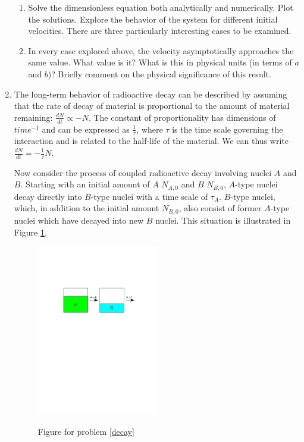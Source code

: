 \documentclass{article}
\begin{document}
\begin{enumerate}
\begin{enumerate}
		\item Solve the dimensionless equation both analytically and numerically. Plot the solutions. Explore the behavior of the system for different initial velocities. There are three particularly interesting cases to be examined.
		\item In every case explored above, the velocity asymptotically approaches the same value. What value is it? What is this in physical units (in terms of $a$ and $b$)? Briefly comment on the physical significance of this result.
	\end{enumerate}
\item\label{decay} The long-term behavior of radioactive decay can be described by assuming that the rate of decay of material is proportional to the amount of material remaining: $\frac{dN}{dt}\propto-N$. The constant of proportionality has dimensions of $time^{-1}$ and can be expressed as $\frac{1}{\tau}$, where $\tau$ is the time scale governing the interaction and is related to the half-life of the material. We can thus write $\frac{dN}{dt}=-\frac{1}{\tau}N$. 

Now consider the process of coupled radioactive decay involving nuclei $A$ and $B$. Starting with an initial amount of $A$ $N_{A,0}$ and $B$ $N_{B,0}$, $A$-type nuclei decay directly into $B$-type nuclei with a time scale of $\tau_A$. $B$-type nuclei, which, in addition to the initial amount $N_{B,0}$, also consist of former $A$-type nuclei which have decayed into new $B$ nuclei. This situation is illustrated in Figure \ref{fig_decay}.

\begin{figure}[ht!]
	\centering
	\includegraphics[width=0.5\textwidth]{drawing_hw1.pdf}
	\label{fig_decay}
	\caption{Figure for problem \ref{decay}}
\end{figure}


\end{enumerate}
\end{document}
